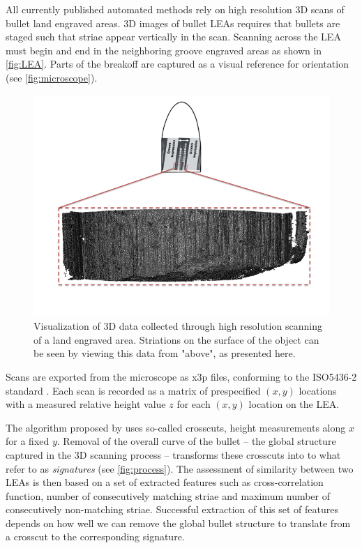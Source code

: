 \documentclass[12pt]{article}
\begin{document}
All currently published automated methods rely on high resolution 3D
scans of bullet land engraved areas.
{\color{teal}{Our approach to the collection of}} 3D images of bullet
LEAs requires that bullets are staged such that striae appear vertically
in the scan. Scanning across the LEA must begin and end in the
neighboring groove engraved areas as shown in \autoref{fig:LEA}. Parts
of the breakoff are captured as a visual reference for orientation (see
\autoref{fig:microscope}).

\begin{figure}
\includegraphics[width=\textwidth]{./images/3d_plot_top_context_breakoff} \caption{\label{LEA}Visualization of 3D data collected through high resolution scanning of a land engraved area. Striations on the surface of the object can be seen by viewing this data from "above", as presented here.}\label{fig:LEA}
\end{figure}

Scans are exported from the microscope as x3p files, conforming to the
ISO5436-2 standard \citep{ISO5436}. Each scan is recorded as a matrix of
prespecified \((x,y)\) locations with a measured relative height value
\(z\) for each \((x,y)\) location on the LEA.

The algorithm proposed by \citet{Hare1} uses so-called crosscuts, height
measurements along \(x\) for a fixed \(y\). Removal of the overall curve
of the bullet -- the global structure captured in the 3D scanning
process -- transforms these crosscuts into to what \citet{Hare1} refer
to as \emph{signatures} (see \autoref{fig:process}). The assessment of
similarity between two LEAs is then based on a set of extracted features
such as cross-correlation function, number of consecutively matching
striae \citep[see][]{Biasotti} and maximum number of consecutively
non-matching striae. Successful extraction of this set of features
depends on how well we can remove the global bullet structure to
translate from a crosscut to the corresponding signature.
\end{document}
